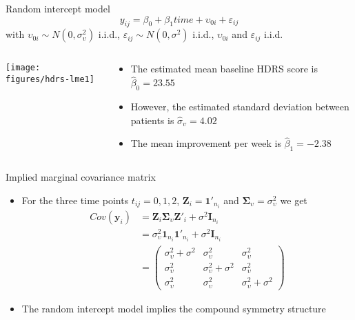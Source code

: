\documentclass[aspectratio=169]{beamer}
\newcommand{\vect}[1]{\mathbf{#1}}
\newcommand{\mat}[1]{\mathbf{#1}}
\newcommand{\gmat}[1]{\boldsymbol{#1}}
\begin{document}
\begin{frame}[fragile]{Random intercept model}
  \[
    y_{ij} = \beta_0 + \beta_1 time + \upsilon_{0i} + \varepsilon_{ij}
  \]
with $\upsilon_{0i} \sim N(0, \sigma^2_{\upsilon})$ i.i.d.,
$\varepsilon_{ij} \sim N(0, \sigma^2)$ i.i.d., $\upsilon_{0i}$ and
$\varepsilon_{ij}$ i.i.d.\\[2ex]
\begin{columns}
\begin{column}{.4\textwidth}
\texttt{[image: figures/hdrs-lme1]}
\end{column}
%
\begin{column}{.5\textwidth}
  \begin{itemize}
    \item The estimated mean baseline HDRS score is $\hat{\beta}_0 =
      23.55$
    \item However, the estimated standard deviation between patients is
      $\hat{\sigma}_\upsilon = 4.02$
    \item The mean improvement per week is $\hat{\beta}_1 = -2.38$
  \end{itemize}
\end{column}
\end{columns}
\end{frame}

\begin{frame}{Implied marginal covariance matrix}
  \begin{itemize}
    \item For the three time points $t_{ij} = 0, 1, 2$, $\mat{Z}_i =
      \vect{1}'_{n_i}$ and $\gmat{\Sigma}_\upsilon = \sigma^2_\upsilon$ we
      get
\begin{align*}
  Cov(\vect{y}_i) &=
    \mat{Z}_i \gmat{\Sigma}_\upsilon \mat{Z}'_i + \sigma^2 \mat{I}_{n_i} \\
  &= \sigma^2_\upsilon \vect{1}_{n_i} \vect{1}'_{n_i} +
     \sigma^2 \mat{I}_{n_i} \\
  &= 
  \begin{pmatrix}
    \sigma^2_\upsilon + \sigma^2 & \sigma^2_\upsilon & \sigma^2_\upsilon \\
    \sigma^2_\upsilon & \sigma^2_\upsilon + \sigma^2 & \sigma^2_\upsilon \\
    \sigma^2_\upsilon & \sigma^2_\upsilon & \sigma^2_\upsilon + \sigma^2
  \end{pmatrix}
\end{align*}
\item The random intercept model implies the compound symmetry structure
  \end{itemize}
\end{frame}
\end{document}

